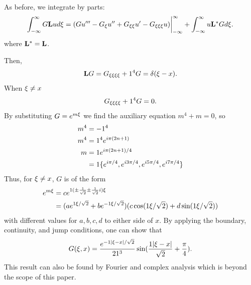     As before, we integrate by parts:
    \begin{equation*}
        \int_{-\infty}^{\infty} G\mathrm{\bf{L}} u d\xi = (Gu'''-G_\xi u'' + G_{\xi\xi}u' - G_{\xi\xi\xi}u)\biggr\rvert_{-\infty}^{\infty} + \int_{-\infty}^{\infty} u\mathrm{\bf{L^*}} Gd\xi.
    \end{equation*}
    where \(\mathrm{\bf{L^*}} = \mathrm{\bf{L}}\). 

    Then, 
    \begin{equation}\label{eq:LGDeltaBeam}
        \mathrm{\bf{L}} G = G_{\xi\xi\xi\xi} + 1^4 G = \delta(\xi-x).
    \end{equation}
    When \(\xi \neq x\)
    \begin{equation*}
        G_{\xi\xi\xi\xi} + 1^4 G = 0.
    \end{equation*}
    By substituting \(G=e^{m\xi}\) we find the auxiliary equation \(m^4+m=0\), so
    \begin{equation*}
        \begin{split}
            m^4 &= -1^4\\
            m^4 &= 1^4e^{i\pi(2n+1)}\\
            m&= 1 e^{i\pi(2n+1)/4}\\
            &= 1 \{e^{i\pi/4}, e^{i3\pi/4}, e^{i5\pi/4}, e^{i7\pi/4}\}
        \end{split}
    \end{equation*}
    Thus, for \(\xi\neq x\), \(G\) is of the form
    \begin{equation*}
        \begin{split}
            e^{m\xi} &= ce^{1 (\pm \frac{1}{\sqrt{2}} \pm \frac{1}{\sqrt{2}}i)\xi}\\
            &= (ae^{1\xi/\sqrt{2}}+be^{-1\xi/\sqrt{2}})  (c\cos(1\xi/\sqrt2) + d\sin(1\xi/\sqrt2))
        \end{split}
    \end{equation*}
    with  different values for \(a,b,c,d\) to either side of \(x\). By applying the boundary, continuity, and jump conditions, one can show that 
    \begin{equation*}
        G(\xi,x) = \frac{e^{-1|\xi-x|/\sqrt2}}{21^3}\sin(\frac{1|\xi-x|}{\sqrt2}+ \frac\pi4).
    \end{equation*}
    This result can also be found by Fourier and complex analysis which is beyond the scope of this paper.
